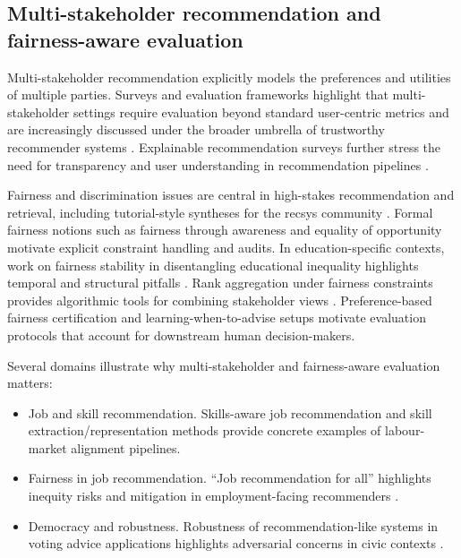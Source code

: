 \documentclass{article}
\begin{document}
\subsection{Multi-stakeholder recommendation and fairness-aware evaluation}
\label{sec:rw-ms}

Multi-stakeholder recommendation explicitly models the preferences and utilities of multiple parties.
Surveys and evaluation frameworks highlight that multi-stakeholder settings require evaluation beyond standard user-centric metrics \cite{abdollahpouri2020multistakeholder,burke2025mseval} and are increasingly discussed under the broader umbrella of trustworthy recommender systems \cite{ge2024trustworthyRS}.
Explainable recommendation surveys further stress the need for transparency and user understanding in recommendation pipelines \cite{zhang2020explainableRS}.

Fairness and discrimination issues are central in high-stakes recommendation and retrieval, including tutorial-style syntheses for the recsys community \cite{ekstrand2019fairness}.
Formal fairness notions such as fairness through awareness \cite{dwork2012fairness} and equality of opportunity \cite{hardt2016equality} motivate explicit constraint handling and audits.
In education-specific contexts, work on fairness stability in disentangling educational inequality highlights temporal and structural pitfalls \cite{fairdas2024}.
Rank aggregation under fairness constraints provides algorithmic tools for combining stakeholder views \cite{fairRankAgg2025}.
Preference-based fairness certification \cite{prefFairCert2023} and learning-when-to-advise setups \cite{advise2023} motivate evaluation protocols that account for downstream human decision-makers.

Several domains illustrate why multi-stakeholder and fairness-aware evaluation matters:
\begin{itemize}
    \item {Job and skill recommendation.} Skills-aware job recommendation and skill extraction/representation methods \cite{giabelli2021skills2job,kara2022skillEmbeddings,leon2024transversalSkills} provide concrete examples of labour-market alignment pipelines.
    \item {Fairness in job recommendation.} ``Job recommendation for all'' highlights inequity risks and mitigation in employment-facing recommenders \cite{bied2023jobrecforall}.
    \item {Democracy and robustness.} Robustness of recommendation-like systems in voting advice applications highlights adversarial concerns in civic contexts \cite{berdoz2025democracy}.
\end{itemize}
\end{document}
